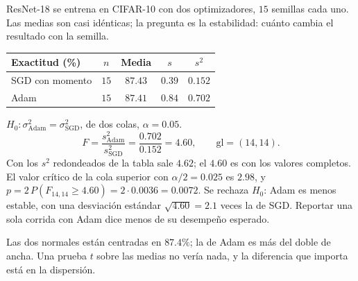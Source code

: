 \documentclass[11pt,letterpaper]{article}
\begin{document}
\begin{ejemplo}
    ResNet-18 se entrena en CIFAR-10 con dos optimizadores, $15$
    semillas cada uno. Las medias son casi idénticas; la pregunta es la
    estabilidad: cuánto cambia el resultado con la semilla.
    \begin{center}
    \small
    \begin{tabular}{lcccc}
        \toprule
        \textbf{Exactitud (\%)} & $n$ & \textbf{Media} & $s$ & $s^2$ \\
        \midrule
        SGD con momento & $15$ & $87.43$ & $0.39$ & $0.152$ \\
        Adam            & $15$ & $87.41$ & $0.84$ & $0.702$ \\
        \bottomrule
    \end{tabular}
    \end{center}
    $H_0\colon \sigma^2_{\text{Adam}} = \sigma^2_{\text{SGD}}$, de dos
    colas, $\alpha = 0.05$.
    \[
        F = \frac{s^2_{\text{Adam}}}{s^2_{\text{SGD}}}
          = \frac{0.702}{0.152} = 4.60 ,
        \qquad
        \text{gl} = (14, 14) .
    \]
    Con los $s^2$ redondeados de la tabla sale $4.62$; el $4.60$ es con
    los valores completos. El valor crítico de la cola superior con
    $\alpha / 2 = 0.025$ es $2.98$, y
    $p = 2\, P(F_{14, 14} \ge 4.60) = 2 \cdot 0.0036 = 0.0072$. Se
    rechaza $H_0$: Adam es menos estable, con una desviación estándar
    $\sqrt{4.60} = 2.1$ veces la de SGD. Reportar una sola corrida con
    Adam dice menos de su desempeño esperado.
\end{ejemplo}

\begin{center}
\end{center}

Las dos normales están centradas en $87.4\%$; la de Adam es más del
doble de ancha. Una prueba $t$ sobre las medias no vería nada, y la
diferencia que importa está en la dispersión.
\end{document}
